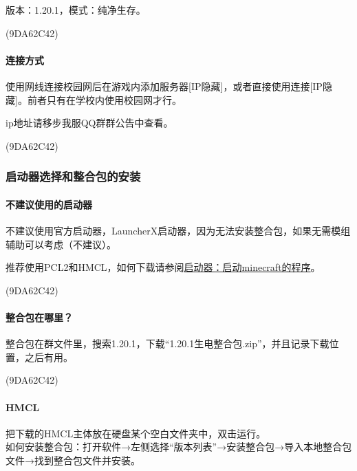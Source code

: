 \documentclass[
]{article}
\begin{document}
版本：1.20.1，模式：纯净生存。

\begin{flushright}(9DA62C42)\end{flushright}

\paragraph{连接方式}\label{section-18}

使用网线连接校园网后在游戏内添加服务器{[}IP隐藏{]}，或者直接使用连接{[}IP隐藏{]}。前者只有在学校内使用校园网才行。

ip地址请移步我服QQ群群公告中查看。

\begin{flushright}(9DA62C42)\end{flushright}

\subsubsection{启动器选择和整合包的安装}\label{section-19}

\paragraph{不建议使用的启动器}\label{section-20}

不建议使用官方启动器，LauncherX启动器，因为无法安装整合包，如果无需模组辅助可以考虑（不建议）。

推荐使用PCL2和HMCL，如何下载请参阅\hyperref[minecraft-3]{启动器：启动minecraft的程序}。

\begin{flushright}(9DA62C42)\end{flushright}

\paragraph{整合包在哪里？}\label{section-21}

整合包在群文件里，搜索1.20.1，下载``1.20.1生电整合包.zip''，并且记录下载位置，之后有用。

\begin{flushright}(9DA62C42)\end{flushright}

\paragraph{HMCL}\label{hmcl}

把下载的HMCL主体放在硬盘某个空白文件夹中，双击运行。\\
如何安装整合包：打开软件→左侧选择``版本列表''→安装整合包→导入本地整合包文件→找到整合包文件并安装。
\end{document}

